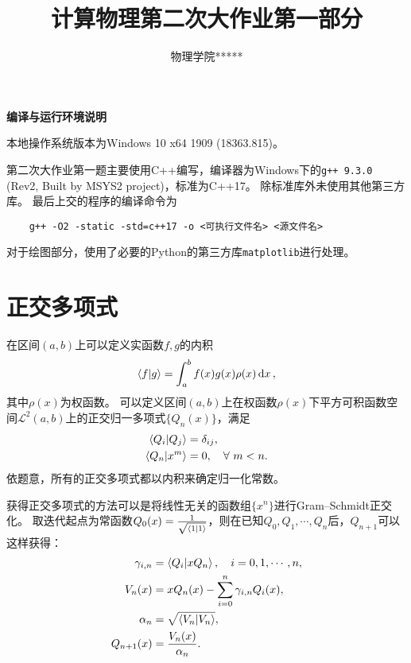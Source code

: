 \documentclass[a4paper,unicode]{report}
\title{计算物理第二次大作业第一部分}
\author{物理学院\quad ***\quad 1800011***}
\begin{document}
\maketitle
\tableofcontents

\begin{center}
    \textbf{编译与运行环境说明}
\end{center}

本地操作系统版本为\textsf{Windows 10 x64 1909 (18363.815)}。

第二次大作业第一题主要使用\textsf{C++}编写，编译器为Windows下的\texttt{g++ 9.3.0} (Rev2, Built by MSYS2 project)，标准为\textsf{C++17}。
除标准库外未使用其他第三方库。
最后上交的程序的编译命令为\begin{verbatim}
    g++ -O2 -static -std=c++17 -o <可执行文件名> <源文件名>
\end{verbatim}

对于绘图部分，使用了必要的\textsf{Python}的第三方库\texttt{matplotlib}进行处理。

\chapter{正交多项式}
在区间$(a, b)$上可以定义实函数$f,g$的内积
\begin{equation}
    \braket{f}{g} = \int_a^b f(x)g(x)\rho(x)\dd{x},
\end{equation}
其中$\rho(x)$为权函数。
可以定义区间$(a, b)$上在权函数$\rho(x)$下平方可积函数空间$\mathcal{L}^2(a, b)$上的正交归一多项式$\{Q_n(x)\}$，满足
\begin{align}
    \braket{Q_i}{Q_j} &{}= \delta_{ij}, \label{eq:ortho_normal}\\
    \braket{Q_n}{x^m} &{}= 0,\quad\forall\ m<n. \label{eq:normal_to_power}
\end{align}
依题意，所有的正交多项式都以内积来确定归一化常数。

获得正交多项式的方法可以是将线性无关的函数组$\{x^n\}$进行Gram--Schmidt正交化。
取迭代起点为常函数$Q_0(x) = \frac{1}{\sqrt{\braket{1}}}$，则在已知$Q_{0},Q_1,\cdots,Q_n$后，$Q_{n+1}$可以这样获得：
\begin{align}
    \gamma_{i, n} &{}= \braket{Q_i}{xQ_n},\quad i=0,1,\cdots,n,\label{eq:def_gamma}\\
    V_n(x) &{}= xQ_n(x) - \sum_{i=0}^n \gamma_{i,n} Q_i(x), \label{eq:V_from_Q}\\
    \alpha_n &{}= \sqrt{\braket{V_n}},\label{eq:alpha}\\
    Q_{n+1}(x) &{}= \frac{V_n(x)}{\alpha_n}.\label{eq:normal}
\end{align}
\end{document}
